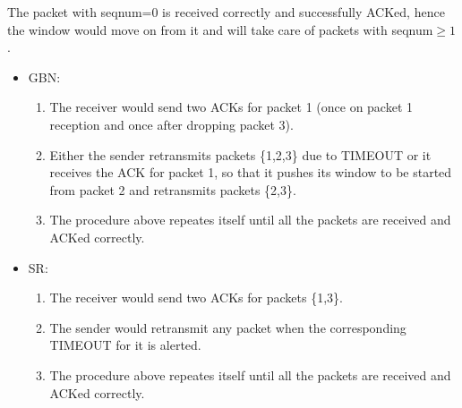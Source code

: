 \documentclass[10pt,letterpaper]{article}
\begin{document}
The packet with seqnum=0 is received correctly and successfully ACKed, hence the window would move on from it and will take care of packets with seqnum$\ge1$.
\begin{itemize}
\item
GBN:
\begin{enumerate}
\item
The receiver would send two ACKs for packet 1 (once on packet 1 reception and once after dropping packet 3).
\item
Either the sender retransmits packets \{1,2,3\} due to TIMEOUT or it receives the ACK for packet 1, so that it pushes its window to be started from packet 2 and retransmits packets \{2,3\}.
\item
The procedure above repeates itself until all the packets are received and ACKed correctly.
\end{enumerate}
\item
SR:
\begin{enumerate}
\item
The receiver would send two ACKs for packets \{1,3\}.
\item
The sender would retransmit any packet when the corresponding TIMEOUT for it is alerted.
\item
The procedure above repeates itself until all the packets are received and ACKed correctly.
\end{enumerate}
\end{itemize}
\end{document}
